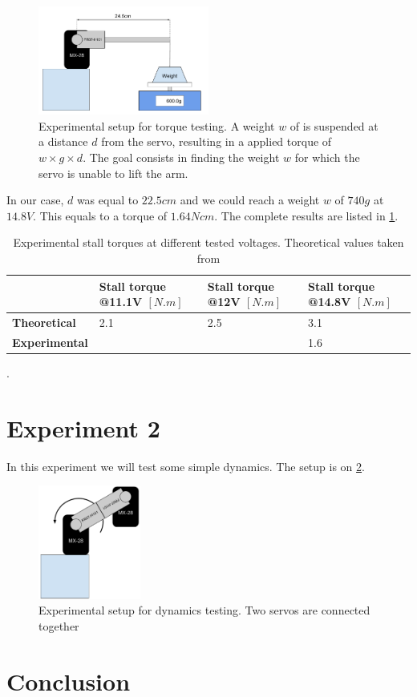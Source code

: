 \begin{figure}[htp]
\center
    \includegraphics[width = 0.5\textwidth]{figures/exp1}
    \caption[Experimental setup for torque testing]{Experimental setup for torque testing. A weight $w$ of is suspended at a distance $d$ from the servo, resulting in a applied torque of $w \times g \times d$. The goal consists in finding the weight $w$ for which the servo is unable to lift the arm.}
    \label{fig:exp1}
\end{figure}

In our case, $d$ was equal to $22.5cm$ and we could reach a weight $w$ of $740g$ at $14.8V$. This equals to a torque of $1.64Ncm$. The complete results are listed in \cref{table:exp1_results}.
\begin{table}[htp]
\center
\begin{tabularx}{\textwidth}{@{}l X X X @{}}
\toprule
& \textbf{Stall torque @11.1V $[N.m]$} & \textbf{Stall torque @12V $[N.m]$} & \textbf{Stall torque @14.8V $[N.m]$}\\ 
\midrule
\textbf{Theoretical} & 2.1 & 2.5 & 3.1\\ 
\textbf{Experimental} &  &  & 1.6\\ 
\bottomrule
\end{tabularx}
\caption[Results of experiment 1]{Experimental stall torques at different tested voltages. Theoretical values taken from \cite{mx_28_manual}}.
\label{table:exp1_results}
\end{table}

\section{Experiment 2}
In this experiment we will test some simple dynamics. The setup is on \cref{fig:exp2}.

\begin{figure}[htp]
\center
    \includegraphics[width = 0.3\textwidth]{figures/exp2}
    \caption[Experimental setup dynamics testing]{Experimental setup for dynamics testing. Two servos are connected together }
    \label{fig:exp2}
\end{figure}


\section{Conclusion}